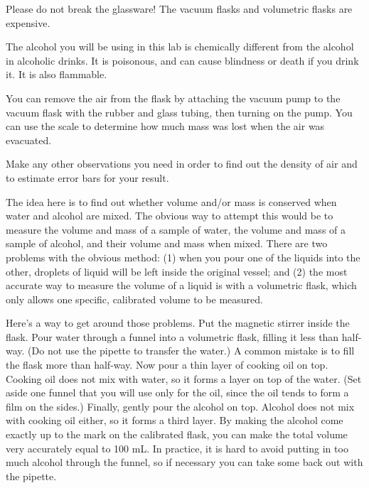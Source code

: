 
Please do not break the glassware!  The vacuum flasks and
volumetric flasks are expensive.

The alcohol you will be using in this lab is chemically
different from the alcohol in alcoholic drinks.  It is
poisonous, and can cause blindness or death if you drink it.
It is also flammable.

\observations


You can remove the air from the flask by attaching the
vacuum pump to the vacuum flask with the rubber and glass
tubing, then turning on the pump.  You can use the scale to
determine how much mass was lost when the air was evacuated.

Make any other observations you need in order to find out
the density of air and to estimate error bars for your result.


The idea here is to find out whether volume and/or mass is
conserved when water and alcohol are mixed.  The obvious way
to attempt this would be to measure the volume and mass of a
sample of water, the volume and mass of a sample of alcohol,
and their volume and mass when mixed.  There are two
problems with the obvious method: (1) when you pour one of
the liquids into the other, droplets of liquid will be left
inside the original vessel; and (2) the most accurate way to
measure the volume of a liquid is with a volumetric flask,
which only allows one specific, calibrated volume to be measured.


Here's a way to get around those problems.  Put the magnetic
stirrer inside the flask.  Pour water through a funnel into
a volumetric flask, filling it less than half-way.  (Do not
use the pipette to transfer the water.)  A common mistake is
to fill the flask more than half-way.  Now pour a thin layer
of cooking oil on top.  Cooking oil does not mix with water,
so it forms a layer on top of the water.  (Set aside one
funnel that you will use only for the oil, since the oil
tends to form a film on the sides.)  Finally, gently pour
the alcohol on top.  Alcohol does not mix with cooking oil
either, so it forms a third layer.  By making the alcohol
come exactly up to the mark on the calibrated flask, you can
make the total volume very accurately equal to 100 mL.  In
practice, it is hard to avoid putting in too much alcohol
through the funnel, so if necessary you can take some back
out with the pipette.

